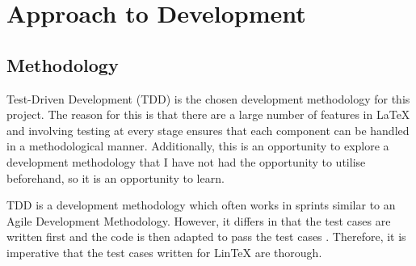 \documentclass[11pt,titlepage,dvipsnames,table,xcdraw]{article}
\begin{document}
\section{Approach to Development}

\subsection{Methodology}
Test-Driven Development (TDD) is the chosen development methodology for this project. The reason for this is that there are a large number of features in LaTeX and involving testing at every stage ensures that each component can be handled in a methodological manner. Additionally, this is an opportunity to explore a development methodology that I have not had the opportunity to utilise beforehand, so it is an opportunity to learn.

TDD is a development methodology which often works in sprints similar to an Agile Development Methodology. However, it differs in that the test cases are written first and the code is then adapted to pass the test cases \cite{tdd}. Therefore, it is imperative that the test cases written for LinTeX are thorough.
\end{document}

